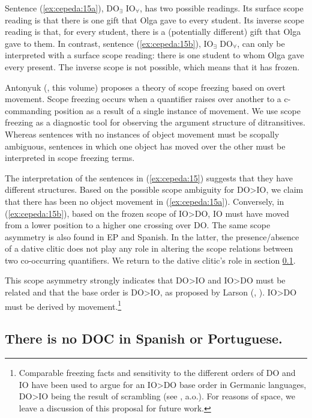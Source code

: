 \documentclass[output=paper,colorlinks,citecolor=brown]{./langscibook}
\begin{document}
Sentence (\ref{ex:cepeda:15a}), DO$_∃$ IO$_∀$, has two possible readings. Its surface scope reading is that there is one gift that Olga gave to every student. Its inverse scope reading is that, for every student, there is a (potentially different) gift that Olga gave to them. In contrast, sentence (\ref{ex:cepeda:15b}), IO$_∃$  DO$_∀$, can only be interpreted with a surface scope reading: there is one student to whom Olga gave every present. The inverse scope is not possible, which means that it has frozen.

Antonyuk (\citeyear{Antonyuk2015}, this volume) proposes a theory of scope freezing based on overt movement. Scope freezing occurs when a quantifier raises over another to a c-commanding position as a result of a single instance of movement. We use scope freezing as a diagnostic tool for observing the argument structure of ditransitives. Whereas sentences with no instances of object movement must be scopally ambiguous, sentences in which one object has moved over the other must be interpreted in scope freezing terms.

The interpretation of the sentences in (\ref{ex:cepeda:15}) suggests that they have different structures. Based on the possible scope ambiguity for DO>IO, we claim that there has been no object movement in (\ref{ex:cepeda:15a}). Conversely, in (\ref{ex:cepeda:15b}), based on the frozen scope of IO>DO, IO must have moved from a lower position to a higher one crossing over DO. The same scope asymmetry is also found in EP and Spanish. In the latter, the presence/absence of a dative clitic does not play any role in altering the scope relations between two co-occurring quantifiers. We return to the dative clitic’s role in section \ref{sec:cepeda:2.2}.

This scope asymmetry strongly indicates that DO>IO and IO>DO must be related and that the base order is DO>IO, as proposed by Larson (\citeyear{Larson1988}, \citeyear{Larson2014}). IO>DO must be derived by movement.\footnote{Comparable freezing facts and sensitivity to the different orders of DO and IO have been used to argue for an IO>DO base order in Germanic languages, DO>IO being the result of scrambling (see \citealt{Abraham1986, Choi1996, Bacovcin2017}, a.o.). For reasons of space, we leave a discussion of this proposal for future work.}

\subsection{There is no DOC in Spanish or Portuguese.}\label{sec:cepeda:2.2}
\end{document}
